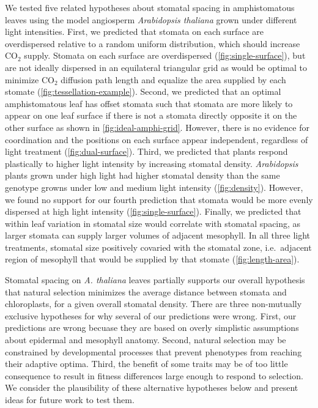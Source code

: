 \documentclass[webpdf,large,modern,unnumsec,namedate]{oup-authoring-template}
\begin{document}
We tested five related hypotheses about stomatal spacing in
amphistomatous leaves using the model angiosperm \emph{Arabidopsis
thaliana} grown under different light intensities. First, we predicted
that stomata on each surface are overdispersed relative to a random
uniform distribution, which should increase CO\(_2\) supply. Stomata on
each surface are overdispersed (\autoref{fig:single-surface}), but are
not ideally dispersed in an equilateral triangular grid as would be
optimal to minimize CO\(_2\) diffusion path length and equalize the area
supplied by each stomate (\autoref{fig:tessellation-example}). Second,
we predicted that an optimal amphistomatous leaf has offset stomata such
that stomata are more likely to appear on one leaf surface if there is
not a stomata directly opposite it on the other surface as shown in
\autoref{fig:ideal-amphi-grid}. However, there is no evidence for
coordination and the positions on each surface appear independent,
regardless of light treatment (\autoref{fig:dual-surface}). Third, we
predicted that plants respond plastically to higher light intensity by
increasing stomatal density. \emph{Arabidopsis} plants grown under high
light had higher stomatal density than the same genotype growns under
low and medium light intensity (\autoref{fig:density}). However, we
found no support for our fourth prediction that stomata would be more
evenly dispersed at high light intensity (\autoref{fig:single-surface}).
Finally, we predicted that within leaf variation in stomatal size would
correlate with stomatal spacing, as larger stomata can supply larger
volumes of adjacent mesophyll. In all three light treatments, stomatal
size positively covaried with the stomatal zone, i.e.~adjacent region of
mesophyll that would be supplied by that stomate
(\autoref{fig:length-area}).

Stomatal spacing on \emph{A. thaliana} leaves partially supports our
overall hypothesis that natural selection minimizes the average distance
between stomata and chloroplasts, for a given overall stomatal density.
There are three non-mutually exclusive hypotheses for why several of our
predictions were wrong. First, our predictions are wrong becuase they
are based on overly simplistic assumptions about epidermal and mesophyll
anatomy. Second, natural selection may be constrained by developmental
processes that prevent phenotypes from reaching their adaptive optima.
Third, the benefit of some traits may be of too little consequence to
result in fitness differences large enough to respond to selection. We
consider the plausibility of these alternative hypotheses below and
present ideas for future work to test them.
\end{document}
